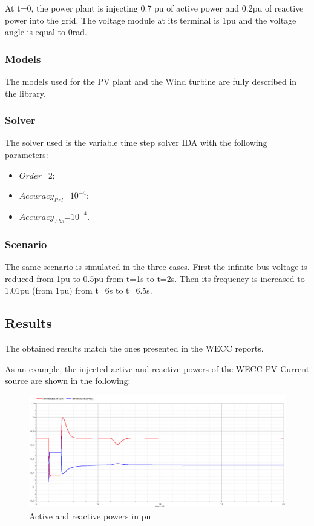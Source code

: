 \documentclass[a4paper, 12pt]{report}
\begin{document}
\par At t=0, the power plant is injecting 0.7 pu of active power and 0.2pu of reactive power into the grid. The voltage module at its terminal is 1pu and the voltage angle is equal to 0rad.

\subsubsection{Models}

\par The models used for the PV plant and the Wind turbine are fully described in the \Dynawo library.

\subsubsection{Solver}

\par The solver used is the variable time step solver IDA with the following parameters:
\begin{itemize}
\item $Order$=2;
\item $Accuracy_{Rel}$=$10^{-4}$;
\item $Accuracy_{Abs}$=$10^{-4}$.
\end{itemize}

\subsubsection{Scenario}

\par The same scenario is simulated in the three cases. First the infinite bus voltage is reduced from 1pu to 0.5pu from t=1s to t=2s. Then its frequency is increased to 1.01pu (from 1pu) from t=6s to t=6.5s.

\subsection{Results}

\par The obtained results match the ones presented in the WECC reports.

\par As an example, the injected active and reactive powers of the WECC PV Current source are shown in the following:

\begin{figure}[H]
  \includegraphics[width=\textwidth]{PQWECC.png}
  \caption{Active and reactive powers in pu}
\end{figure}
\end{document}

